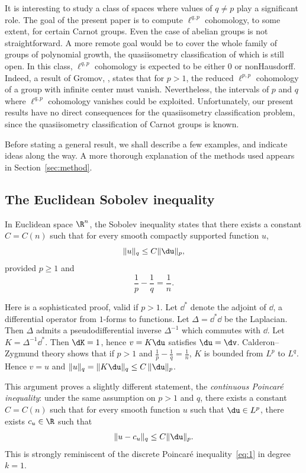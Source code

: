 It is interesting to study a class of spaces where values of $q\not=p$ play a significant role. The goal of the present paper is to compute $\ell^{q,p}$ cohomology, to some extent, for certain Carnot groups. Even the case of abelian groups is not straightforward. A more remote goal would be to cover the whole family of groups of polynomial growth, the quasiisometry classification of which is still open. In this class, $\ell^{q,p}$ cohomology is expected to be either $0$ or nonHausdorff. Indeed, a result of Gromov, \cite[8.C]{Gromov}, states that for $p>1$, the reduced $\ell^{p,p}$ cohomology of a group with infinite center must vanish. Nevertheless, the intervals of $p$ and $q$ where $\ell^{q,p}$ cohomology vanishes could be exploited. Unfortunately, our present results have no direct consequences for the quasiisometry classification problem, since the quasiisometry classification of Carnot groups is known.

Before stating a general result, we shall describe a few examples, and indicate ideas along the way. A more thorough explanation of the methods used appears in Section~\ref{sec:method}.

\subsection{The Euclidean Sobolev inequality}

In Euclidean space $\R^n$, the Sobolev inequality states that there exists a constant $C=C(n)$ such that for every smooth compactly supported function $u$,
\begin{equation}\label{eq:2}
\|u\|_q \leq C \|\du\|_p,
\end{equation}
provided $p\geq 1$ and
\begin{equation*}
\frac{1}{p}-\frac{1}{q}=\frac{1}{n}.
\end{equation*}

Here is a sophisticated proof, valid if $p>1$. Let $\dd^*$ denote the adjoint of $\dd$, a differential operator from $1$-forms to functions. Let $\Delta=\dd^*\dd$ be the Laplacian. Then $\Delta$ admits a pseudodifferential inverse $\Delta^{-1}$ which commutes with $\dd$. Let $K=\Delta^{-1}\dd^*$. Then $\dK=1$, hence $v=K\du$ satisfies $\du=\dv$. Calderon--Zygmund theory shows that if $p>1$ and $\frac{1}{p}-\frac{1}{q}=\frac{1}{n}$, $K$ is bounded from $L^p$ to $L^q$. Hence $v=u$ and $\|u\|_q=\|K\du\|_q\leq C\,\|\du\|_p$.

This argument proves a slightly different statement, the \emph{continuous Poincar\'e inequality}: under the same assumption on $p>1$ and $q$, there exists a constant $C=C(n)$ such that for every smooth function $u$ such that $\du\in L^p$, there exists $c_u\in\R$ such that
\begin{equation}\label{eq:3}
\|u-c_u\|_q \leq C \|\du\|_p.
\end{equation}
This is strongly reminiscent of the discrete Poincar\'e inequality~\eqref{eq:1} in degree $k=1$.

